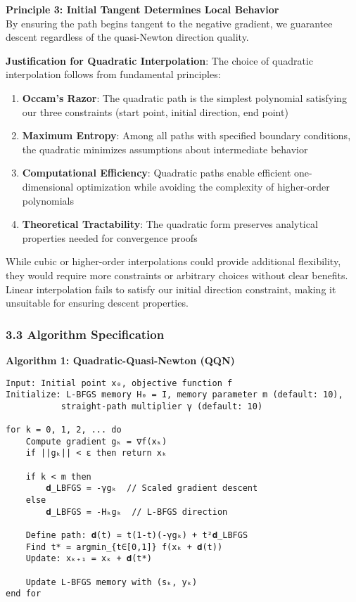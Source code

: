\textbf{Principle 3: Initial Tangent Determines Local Behavior}\\
By ensuring the path begins tangent to the negative gradient, we guarantee descent regardless of the quasi-Newton direction quality.

\textbf{Justification for Quadratic Interpolation}: The choice of quadratic interpolation follows from fundamental principles:

\begin{enumerate}
\def\labelenumi{\arabic{enumi}.}
\tightlist
\item
  \textbf{Occam's Razor}: The quadratic path is the simplest polynomial satisfying our three constraints (start point, initial direction, end point)
\item
  \textbf{Maximum Entropy}: Among all paths with specified boundary conditions, the quadratic minimizes assumptions about intermediate behavior
\item
  \textbf{Computational Efficiency}: Quadratic paths enable efficient one-dimensional optimization while avoiding the complexity of higher-order polynomials
\item
  \textbf{Theoretical Tractability}: The quadratic form preserves analytical properties needed for convergence proofs
\end{enumerate}

While cubic or higher-order interpolations could provide additional flexibility, they would require more constraints or arbitrary choices without clear benefits.
Linear interpolation fails to satisfy our initial direction constraint, making it unsuitable for ensuring descent properties.

\hypertarget{algorithm-specification}{%
\subsubsection{3.3 Algorithm Specification}\label{algorithm-specification}}

\textbf{Algorithm 1: Quadratic-Quasi-Newton (QQN)}

\begin{verbatim}
Input: Initial point x₀, objective function f
Initialize: L-BFGS memory H₀ = I, memory parameter m (default: 10),
           straight-path multiplier γ (default: 10)

for k = 0, 1, 2, ... do
    Compute gradient gₖ = ∇f(xₖ)
    if ||gₖ|| < ε then return xₖ

    if k < m then
        𝐝_LBFGS = -γgₖ  // Scaled gradient descent
    else
        𝐝_LBFGS = -Hₖgₖ  // L-BFGS direction

    Define path: 𝐝(t) = t(1-t)(-γgₖ) + t²𝐝_LBFGS
    Find t* = argmin_{t∈[0,1]} f(xₖ + 𝐝(t))
    Update: xₖ₊₁ = xₖ + 𝐝(t*)

    Update L-BFGS memory with (sₖ, yₖ)
end for
\end{verbatim}

